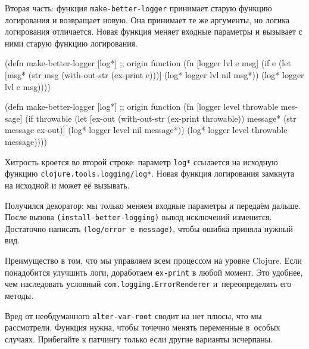 \fi

Вторая часть: функция \texttt{make-better-logger} принимает старую функцию
логирования и возвращает новую. Она принимает те же аргументы, но логика
логирования отличается. Новая функция меняет входные параметры и вызывает с ними
старую функцию логирования.

\ifnarrow

\begin{english}
  \begin{clojure/lines}
(defn make-better-logger
  [log*] ;; origin function
  (fn [logger lvl e msg]
    (if e
      (let [msg*
            (str msg \newline
                 (with-out-str
                   (ex-print e)))]
        (log* logger lvl nil msg*))
      (log* logger lvl e msg))))
  \end{clojure/lines}
\end{english}

\else

\begin{english}
  \begin{clojure/lines}
(defn make-better-logger
  [log*] ;; origin function
  (fn [logger level throwable message]
    (if throwable
      (let [ex-out (with-out-str (ex-print throwable))
            message* (str message \newline ex-out)]
        (log* logger level nil message*))
      (log* logger level throwable message))))
  \end{clojure/lines}
\end{english}

\fi

Хитрость кроется во второй строке: параметр \verb|log*| ссылается на исходную
функцию \verb|clojure.tools.logging/log*|. Новая функция логирования замкнута на
исходной и может её вызывать.

Получился декоратор: мы только меняем входные параметры и передаём дальше. После
вызова \verb|(install-better-logging)| вывод исключений изменится. Достаточно
написать \texttt{(log/error e message)}, чтобы ошибка приняла нужный вид.

Преимущество в том, что мы управляем всем процессом на уровне Clojure. Если
понадобится улучшить логи, доработаем \verb|ex-print| в любой момент. Это
удобнее, чем наследовать условный \verb|com.logging.ErrorRenderer|
и~переопределять его методы.

Вред от необдуманного \verb|alter-var-root| сводит на нет плюсы, что мы
рассмотрели. Функция нужна, чтобы точечно менять переменные в~особых
случаях. Прибегайте к патчингу только если другие варианты исчерпаны.

